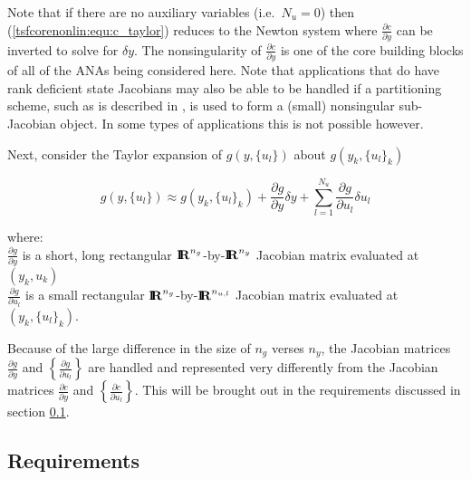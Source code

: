 Note that if there are no auxiliary variables (i.e.~$N_u = 0$) then
(\ref{tsfcorenonlin:equ:c_taylor}) reduces to the Newton system where
$\frac{\partial c}{\partial y}$ can be inverted to solve for $\delta
y$.  The nonsingularity of $\frac{\partial c}{\partial y}$ is one of
the core building blocks of all of the ANAs being considered here.
Note that applications that do have rank deficient state Jacobians may
also be able to be handled if a partitioning scheme, such as is
described in \cite{ref:moochouserguide}, is used to form a (small)
nonsingular sub-Jacobian object.  In some types of applications this
is not possible however.

Next, consider the Taylor expansion of $g(y,\{u_l\})$ about
$g(y_k,\{u_l\}_k)$

\begin{equation}
g(y,\{u_l\}) \approx g(y_k,\{u_l\}_k) + \frac{\partial g}{\partial y} \delta y
+ \sum_{l=1}^{N_u} \frac{\partial g}{\partial u_l} \delta u_l
\label{tsfcorenonlin:equ:g_taylor}
\end{equation}
\begin{tabbing}
\hspace{4ex}where:\hspace{5ex}\= \\
\>	$\frac{\partial g}{\partial y}$ is a short, long rectangular $\mbox{\textbf{I}}\hspace{-0.6ex}\mbox{\textbf{R}}^{n_g}$-by-$\mbox{\textbf{I}}\hspace{-0.6ex}\mbox{\textbf{R}}^{n_y}$ Jacobian matrix
	evaluated at $(y_k,u_k)$ \\
\>	$\frac{\partial g}{\partial u_l}$ is a small rectangular $\mbox{\textbf{I}}\hspace{-0.6ex}\mbox{\textbf{R}}^{n_g}$-by-$\mbox{\textbf{I}}\hspace{-0.6ex}\mbox{\textbf{R}}^{n_{u,l}}$ Jacobian matrix
	evaluated at $(y_k,\{u_l\}_k)$.
\end{tabbing}

Because of the large difference in the size of $n_g$ verses $n_y$, the
Jacobian matrices $\frac{\partial g}{\partial y}$ and
$\left\{\frac{\partial g}{\partial u_l}\right\}$ are handled and
represented very differently from the Jacobian matrices $\frac{\partial
c}{\partial y}$ and $\left\{\frac{\partial c}{\partial u_l}\right\}$.
This will be brought out in the requirements discussed in
section \ref{tsfcorenonlin:sec:requirements}.

%
\subsection{Requirements}
\label{tsfcorenonlin:sec:requirements}
%

